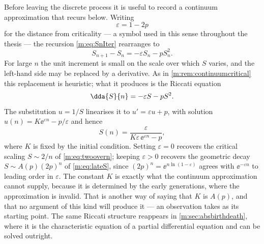 Before leaving the discrete process it is useful to record a continuum
approximation that recurs below. Writing
\begin{equation}
\label{m:eq:epsdef}
\varepsilon = 1-2p
\end{equation}
for the distance from criticality --- a symbol used in this sense throughout the
thesis --- the recursion \cref{m:eq:SnIter} rearranges to
\begin{equation}
\label{m:eq:Sdiff}
S_{n+1}-S_n = -\varepsilon S_n - pS_n^2 .
\end{equation}
For large $n$ the unit increment is small on the scale over which $S$ varies, and
the left-hand side may be replaced by a derivative. As in
\cref{m:rem:continuumcritical} this replacement is heuristic; what it produces is
the Riccati equation
\begin{equation}
\label{m:eq:riccati}
\dda{S}{n} = -\varepsilon S - pS^2 .
\end{equation}
The substitution $u=1/S$ linearises it to $u' = \varepsilon u + p$, with solution
$u(n) = K\ee^{\varepsilon n}-p/\varepsilon$ and hence
\begin{equation}
\label{m:eq:riccatisol}
S(n) = \frac{\varepsilon}{K\varepsilon\,\ee^{\varepsilon n}-p},
\end{equation}
where $K$ is fixed by the initial condition. Setting $\varepsilon=0$ recovers the
critical scaling $S\sim2/n$ of \cref{m:eq:twoovern}; keeping $\varepsilon>0$
recovers the geometric decay $S\sim A(p)(2p)^n$ of \cref{m:eq:lateS}, since
$(2p)^n = \ee^{n\ln(1-\varepsilon)}$ agrees with $\ee^{-\varepsilon n}$ to leading
order in $\varepsilon$. The constant $K$ is exactly what the continuum
approximation cannot supply, because it is determined by the early generations,
where the approximation is invalid. That is another way of saying that $K$ is
$A(p)$, and that no argument of this kind will produce it --- an observation \ChA{}
takes as its starting point. The same Riccati structure reappears in
\cref{m:sec:absbirthdeath}, where it is the characteristic equation of a partial
differential equation and can be solved outright.

\FloatBarrier
